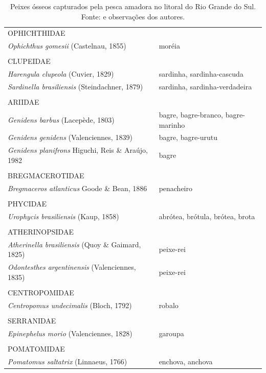 \documentclass[a4paper,11pt,twoside,showtrims,onecolumn,openright,final]{memoir}
\begin{document}
\begin{table}
\caption[Peixes ósseos capturados pela pesca amadora no litoral do Rio Grande do Sul.]
        {Peixes ósseos capturados pela pesca amadora no litoral do Rio Grande do Sul. 
         Fonte: \citet{lewis1999} e observações dos autores.}
\label{tab:amador-tele}	 
\begin{center}
\begin{small}
\begin{tabular*}{\textwidth}{l@{\extracolsep{\fill}}p{}}
\toprule
OPHICHTHIDAE					& \\
\emph{Ophichthus gomesii} (Castelnau, 1855)		& moréia \\
						& \\
CLUPEIDAE					& \\
\emph{Harengula clupeola} (Cuvier, 1829)		& sardinha, sardinha-cascuda \\
\emph{Sardinella brasiliensis} (Steindachner, 1879)	& sardinha, sardinha-verdadeira \\
						& \\
ARIIDAE						& \\
\emph{Genidens barbus} (Lacepède, 1803)		& bagre, bagre-branco, bagre-marinho \\
\emph{Genidens genidens} (Valenciennes, 1839)		& bagre, bagre-urutu \\
\emph{Genidens planifrons} Higuchi, Reis \& Araújo, 1982 & bagre \\
						& \\
BREGMACEROTIDAE					& \\
\emph{Bregmaceros atlanticus} Goode \& Bean, 1886	& penacheiro \\
						& \\
PHYCIDAE					& \\
\emph{Urophycis  brasiliensis}  (Kaup, 1858)		& abrótea, brótula, brótea, brota \\
						& \\
ATHERINOPSIDAE					& \\
\emph{Atherinella brasiliensis} (Quoy \& Gaimard, 1825)	& peixe-rei \\
\emph{Odontesthes argentinensis} (Valenciennes, 1835)	& peixe-rei \\
						& \\
CENTROPOMIDAE					& \\
\emph{Centropomus undecimalis} (Bloch, 1792)		& robalo \\
						& \\
SERRANIDAE					& \\
\emph{Epinephelus morio} (Valenciennes, 1828)		& garoupa \\
						& \\
POMATOMIDAE					& \\
\emph{Pomatomus saltatrix} (Linnaeus, 1766)		& enchova, anchova \\
\bottomrule
\end{tabular*}
\end{small}
\end{center}
\end{table}
\end{document}
